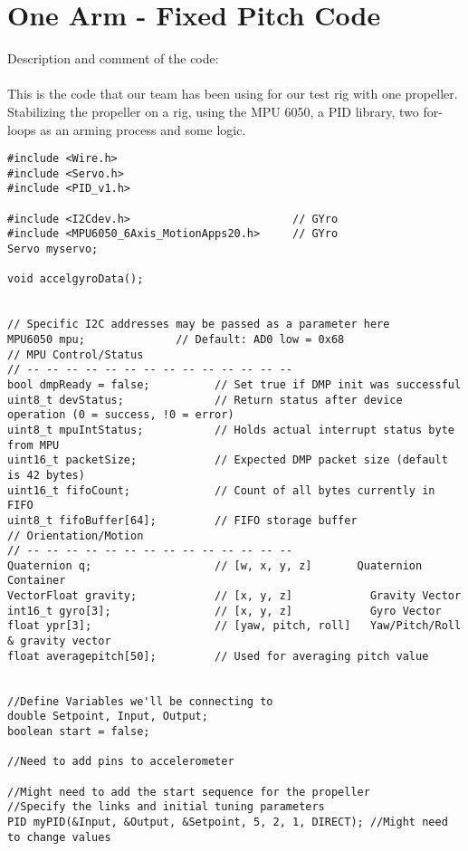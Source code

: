 \section{One Arm - Fixed Pitch Code}

Description and comment of the code: \\
\\
This is the code that our team has been using for our test rig with one propeller. Stabilizing the propeller on a rig, using the MPU 6050, a PID library, two for-loops as an arming process and some logic. \\

\begin{lstlisting}
#include <Wire.h>
#include <Servo.h>
#include <PID_v1.h>
 
#include <I2Cdev.h>                         // GYro
#include <MPU6050_6Axis_MotionApps20.h>     // GYro
Servo myservo;
 
void accelgyroData();
 
 
// Specific I2C addresses may be passed as a parameter here
MPU6050 mpu;              // Default: AD0 low = 0x68
// MPU Control/Status
// -- -- -- -- -- -- -- -- -- -- -- -- -- --
bool dmpReady = false;          // Set true if DMP init was successful
uint8_t devStatus;              // Return status after device operation (0 = success, !0 = error)
uint8_t mpuIntStatus;           // Holds actual interrupt status byte from MPU
uint16_t packetSize;            // Expected DMP packet size (default is 42 bytes)
uint16_t fifoCount;             // Count of all bytes currently in FIFO
uint8_t fifoBuffer[64];         // FIFO storage buffer
// Orientation/Motion
// -- -- -- -- -- -- -- -- -- -- -- -- -- --
Quaternion q;                   // [w, x, y, z]       Quaternion Container
VectorFloat gravity;            // [x, y, z]            Gravity Vector
int16_t gyro[3];                // [x, y, z]            Gyro Vector
float ypr[3];                   // [yaw, pitch, roll]   Yaw/Pitch/Roll & gravity vector
float averagepitch[50];         // Used for averaging pitch value
 
 
//Define Variables we'll be connecting to
double Setpoint, Input, Output;
boolean start = false;
 
//Need to add pins to accelerometer
 
//Might need to add the start sequence for the propeller
//Specify the links and initial tuning parameters
PID myPID(&Input, &Output, &Setpoint, 5, 2, 1, DIRECT); //Might need to change values
 

\end{lstlisting}
